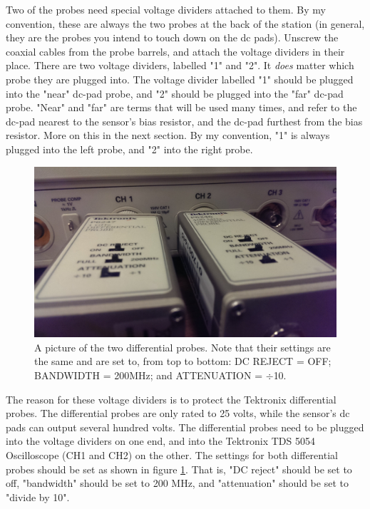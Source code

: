 \documentclass{report}
\begin{document}
            Two of the probes need special voltage dividers attached to them. By my convention, these are always the two probes at the back of the station (in general, they are the probes you intend to touch down on the dc pads). Unscrew the coaxial cables from the probe barrels, and attach the voltage dividers in their place. There are two voltage dividers, labelled "1" and "2". It \textit{does} matter which probe they are plugged into. The voltage divider labelled "1" should be plugged into the "near" dc-pad probe, and "2" should be plugged into the "far" dc-pad probe. "Near" and "far" are terms that will be used many times, and refer to the dc-pad nearest to the sensor's bias resistor, and the dc-pad furthest from the bias resistor. More on this in the next section. By my convention, "1" is always plugged into the left probe, and "2" into the right probe.
            
            \begin{figure}[h] 
                \includegraphics[height=.4\textheight]{diff_probe}
                \centering
                \caption{ A picture of the two differential probes. Note that their settings are the same and are set to, from top to bottom: DC REJECT = OFF; BANDWIDTH = 200MHz; and ATTENUATION = $\div$10. }
                \label{fig:diff_probe}
            \end{figure}

            The reason for these voltage dividers is to protect the Tektronix differential probes. The differential probes are only rated to 25 volts, while the sensor's dc pads can output several hundred volts. The differential probes need to be plugged into the voltage dividers on one end, and into the Tektronix TDS 5054 Oscilloscope (CH1 and CH2) on the other. The settings for both differential probes should be set as shown in figure \ref{fig:diff_probe}. That is, "DC reject" should be set to off, "bandwidth" should be set to 200 MHz, and "attenuation" should be set to "divide by 10".
\end{document}

